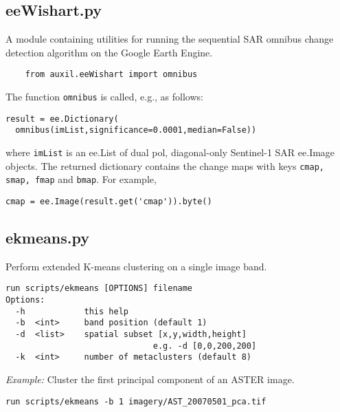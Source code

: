 \documentclass{paper}
\begin{document}
\subsection*{eeWishart.py}
A module containing utilities for running the sequential SAR omnibus change detection algorithm on the Google Earth Engine.
\begin{verbatim}
    from auxil.eeWishart import omnibus
\end{verbatim}
The function {\tt omnibus} is called, e.g., as follows:
\begin{lstlisting}
result = ee.Dictionary(
  omnibus(imList,significance=0.0001,median=False))
\end{lstlisting}
where {\tt imList} is an ee.List of dual pol, diagonal-only Sentinel-1 SAR ee.Image objects. The returned dictionary contains the change maps with keys
{\tt cmap, smap, fmap} and {\tt bmap}. For example,
\begin{lstlisting}
cmap = ee.Image(result.get('cmap')).byte()
\end{lstlisting}




\subsection*{ekmeans.py}
Perform extended K-means clustering on a single image band.
\begin{verbatim}
run scripts/ekmeans [OPTIONS] filename
Options:
  -h            this help
  -b  <int>     band position (default 1)
  -d  <list>    spatial subset [x,y,width,height]
                              e.g. -d [0,0,200,200]
  -k  <int>     number of metaclusters (default 8)
\end{verbatim}
{\it Example:} Cluster the first principal component  of an ASTER image.
\begin{lstlisting}
run scripts/ekmeans -b 1 imagery/AST_20070501_pca.tif
\end{lstlisting}
\end{document}
